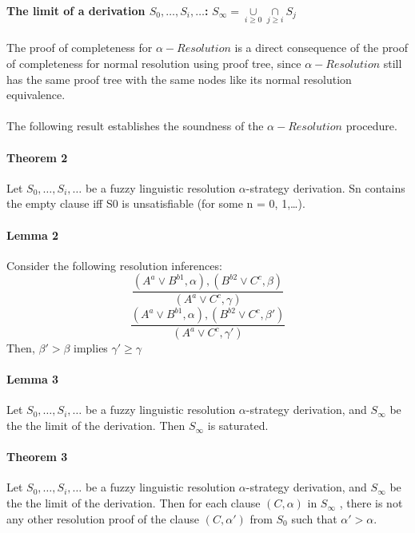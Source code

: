 \documentclass[part1.tex]{subfiles}
\begin{document}
\paragraph{} 
{\bfseries The limit of a derivation $S_{0},\ldots,S_{i},\ldots$:} 
$S_{\infty} = \underset{i \ge 0}{\cup} \underset{j \ge i}{\cap}S_{j}$
\\

\paragraph{} The proof of completeness for $\alpha-Resolution$ is a direct
consequence of the proof of completeness for normal resolution
using proof tree, since $\alpha-Resolution$ still has the 
same proof tree with the same nodes like its normal resolution
equivalence.

\paragraph{} The following result establishes the soundness of
the $\alpha-Resolution$ procedure.
\paragraph{Theorem 2}
Let $S_{0},\ldots,S_{i},\ldots$ be a fuzzy linguistic resolution $\alpha$-strategy derivation.
Sn contains the empty clause iff S0 is unsatisfiable (for some n = 0, 1,\ldots).
\paragraph{Lemma 2} 
Consider the following resolution inferences:
\[ \frac{(A^{a} \vee B^{b1}, \alpha), (B^{b2} \vee C^{c}, \beta)} {(A^{a} \vee C^{c}, \gamma)}\]
\[\frac{(A^{a} \vee B^{b1}, \alpha), (B^{b2} \vee C^{c}, \beta')} {(A^{a} \vee C^{c}, \gamma')}\]
Then, $\beta' > \beta$ implies $\gamma' \ge \gamma$

\paragraph{Lemma 3} Let $S_{0},\ldots,S_{i},\ldots$ be a fuzzy linguistic 
resolution $\alpha$-strategy derivation, and $S_{\infty}$ be the the limit of the derivation.
Then $S_{\infty}$ is saturated.

\paragraph{Theorem 3} Let $S_{0},\ldots,S_{i},\ldots$ be a fuzzy linguistic 
resolution $\alpha$-strategy derivation, and $S_{\infty}$ be the the limit of the derivation. 
Then for each clause $(C, \alpha)$ in $S_{\infty}$ , there is not any other resolution proof 
of the clause $(C, \alpha')$ from $S_{0}$ such that $\alpha' > \alpha$.
\end{document}
